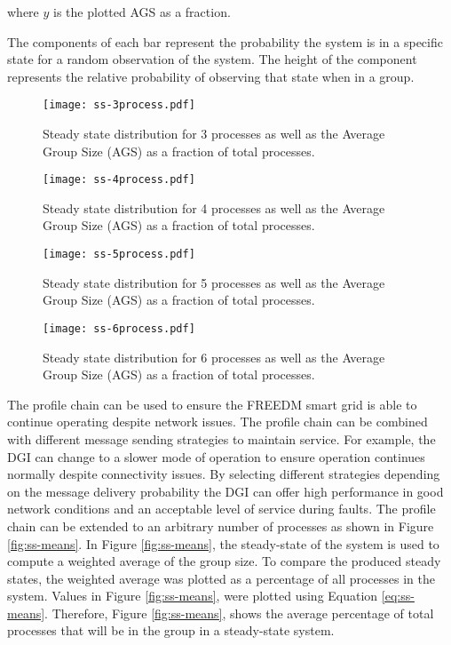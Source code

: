 where $y$ is the plotted AGS as a fraction.

The components of each bar represent the probability the system is in a specific state for a random observation of the system.
The height of the component represents the relative probability of observing that state when in a group.

\begin{figure}
    \centering
    \texttt{[image: ss-3process.pdf]}
    \caption{Steady state distribution for 3 processes as well as the Average Group Size (AGS) as a fraction of total processes.}
    \label{fig:ss-3process}
\end{figure}

\begin{figure}
    \centering
    \texttt{[image: ss-4process.pdf]}
    \caption{Steady state distribution for 4 processes as well as the Average Group Size (AGS) as a fraction of total processes.}
    \label{fig:ss-4process}
\end{figure}

\begin{figure}
    \centering
    \texttt{[image: ss-5process.pdf]}
    \caption{Steady state distribution for 5 processes as well as the Average Group Size (AGS) as a fraction of total processes.}
    \label{fig:ss-5process}
\end{figure}

\begin{figure}
    \centering
    \texttt{[image: ss-6process.pdf]}
    \caption{Steady state distribution for 6 processes as well as the Average Group Size (AGS) as a fraction of total processes.}
    \label{fig:ss-6process}
\end{figure}

The profile chain can be used to ensure the FREEDM smart grid is able to continue operating despite network issues.
The profile chain can be combined with different message sending strategies to maintain service.
For example, the DGI can change to a slower mode of operation to ensure operation continues normally despite connectivity issues.
By selecting different strategies depending on the message delivery probability the DGI can offer high performance in good network conditions and an acceptable level of service during faults.
The profile chain can be extended to an arbitrary number of processes as shown in Figure \ref{fig:ss-means}.
In Figure \ref{fig:ss-means}, the steady-state of the system is used to compute a weighted average of the group size.
To compare the produced steady states, the weighted average was plotted as a percentage of all processes in the system.
Values in Figure \ref{fig:ss-means}, were plotted using Equation \ref{eq:ss-means}.
Therefore, Figure \ref{fig:ss-means}, shows the average percentage of total processes that will be in the group in a steady-state system.

